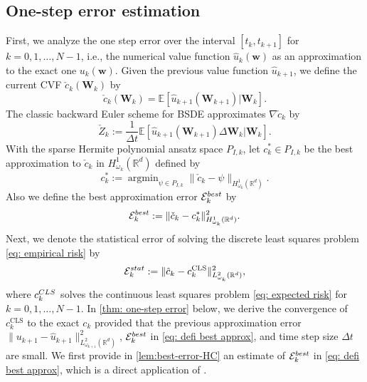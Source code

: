 \documentclass[10pt,a4paper]{amsart}
\numberwithin{equation}{section}
\numberwithin{algorithm}{section}
\theoremstyle{plain}
\theoremstyle{remark}
\DeclareMathOperator*{\argmin}{argmin}
\newcommand{\op}{\operatorname}
\newcommand{\R}{\mathbb{R}}
\begin{document}
\subsection{One-step error estimation}
First, we analyze the one step error over the interval $[t_k,t_{k+1}]$ for $k = 0,1,\dots,N-1$, i.e., the numerical value function $\hat{u}_{k}(\mathbf{w})$ as an approximation to the exact one ${u}_{k}(\mathbf{w})$. Given the previous value function $\hat{u}_{k+1}$, we define the current CVF  $ \check{c}_k(\mathbf{W}_k)$ by
\begin{equation}\label{eq:apprx-conti}
    \check{c}_k(\mathbf{W}_k) = \mathbb{E}[\hat{u}_{k+1}(\mathbf{W}_{k+1}) | \mathbf{W}_k].
\end{equation}
The classic backward Euler scheme for BSDE approximates $\nabla\check{c}_k$ by
\begin{equation}\label{eq:grad-est}
     \check{Z}_k:=\frac{1}{\Delta t} \mathbb{E}[\hat{u}_{k+1}(\mathbf{W}_{k+1})\Delta \mathbf{W}_k | \mathbf{W}_k].
\end{equation}
With the sparse Hermite polynomial ansatz space $P_{I,k}$, let $c_k^* \in P_{I,k}$ be the best approximation to $\check{c}_k$ in $H^1_{\omega_k}(\mathbb{R}^d)$ defined by
\begin{equation}\label{eq:best-approx}
    c^*_k := \argmin_{\psi \in P_{I,k}} \|\check{c}_k - \psi\|_{H^1_{\omega_k}(\R^d)}.
\end{equation}
Also we define the best approximation error $\mathcal{E}_k^{\rm best}$ by
\begin{equation} \label{eq: defi best approx}
    \mathcal{E}_k^{\rm best} := \|\check{c}_k - c_k^*\|_{H^1_{\omega_k}(\R^d)}^2.
\end{equation}
Next, we denote the statistical error of solving the discrete least squares problem \cref{eq: empirical risk} by
\begin{align}\label{eq:stat-lsm}
\mathcal{E}^{\rm stat}_k := \|\hat{c}_k - c_k^{\op{CLS}}\|_{{L}^2_{\omega_k}(\R^d)}^2,
\end{align}
where $c_k^{\rm CLS}$ solves the continuous least squares problem \cref{eq: expected risk} for $k = 0,1,\dots,N-1$.
In \cref{thm: one-step error} below, we derive the convergence of $c_k^{\op{CLS}}$ to the exact $c_k$ provided that the previous approximation error $\|u_{k+1} - \hat{u}_{k+1}\|_{L_{\omega_{k+1}}^2(\R^d)}^2$,  $\mathcal{E}_k^{\rm best}$ in \cref{eq: defi best approx}, and time step size $\Delta t$ are small. We first provide in \cref{lem:best-error-HC} an estimate of $\mathcal{E}_k^{\rm best}$ in \cref{eq: defi best approx}, which is a direct application of \cite[Theorem 4.2]{luo2018error}.
\end{document}
